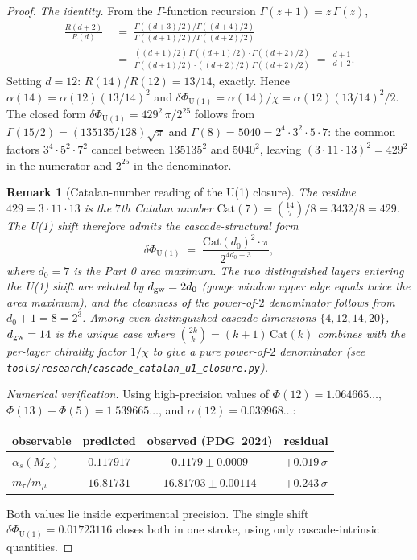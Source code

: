 \documentclass[12pt,a4paper]{article}
\newtheorem*{remark}{Remark}
\begin{document}
\begin{proof}
\emph{The identity.} From the $\Gamma$-function recursion $\Gamma(z+1)=z\,\Gamma(z)$,
\[
\begin{aligned}
\frac{R(d+2)}{R(d)}
&\;=\; \frac{\Gamma((d+3)/2)/\Gamma((d+4)/2)}{\Gamma((d+1)/2)/\Gamma((d+2)/2)} \\
&\;=\; \frac{((d+1)/2)\,\Gamma((d+1)/2)\cdot\Gamma((d+2)/2)}{\Gamma((d+1)/2)\cdot((d+2)/2)\,\Gamma((d+2)/2)}
\;=\; \frac{d+1}{d+2}.
\end{aligned}
\]
Setting $d=12$: $R(14)/R(12)=13/14$, exactly. Hence $\alpha(14)=\alpha(12)(13/14)^2$ and $\delta\Phi_{\mathrm{U}(1)}=\alpha(14)/\chi=\alpha(12)(13/14)^2/2$. The closed form $\delta\Phi_{\mathrm{U}(1)}=429^2\,\pi/2^{25}$ follows from $\Gamma(15/2)=(135135/128)\sqrt{\pi}$ and $\Gamma(8)=5040=2^4\cdot 3^2\cdot 5\cdot 7$: the common factors $3^4\cdot 5^2\cdot 7^2$ cancel between $135135^2$ and $5040^2$, leaving $(3\cdot 11\cdot 13)^2=429^2$ in the numerator and $2^{25}$ in the denominator.

\begin{remark}[Catalan-number reading of the U(1) closure]\label{rem:catalan-u1-closure}
The residue $429 = 3 \cdot 11 \cdot 13$ is the $7$th Catalan number $\mathrm{Cat}(7) = \binom{14}{7}/8 = 3432/8 = 429$. The U(1) shift therefore admits the cascade-structural form
\[
\delta\Phi_{\mathrm{U}(1)} \;=\; \frac{\mathrm{Cat}(d_0)^2 \cdot \pi}{2^{4 d_0 - 3}},
\]
where $d_0 = 7$ is the Part 0 area maximum. The two distinguished layers entering the U(1) shift are related by $d_{\rm gw} = 2 d_0$ (gauge window upper edge equals twice the area maximum), and the cleanness of the power-of-$2$ denominator follows from $d_0 + 1 = 8 = 2^3$. Among even distinguished cascade dimensions $\{4, 12, 14, 20\}$, $d_{\rm gw} = 14$ is the unique case where $\binom{2k}{k} = (k+1)\,\mathrm{Cat}(k)$ combines with the per-layer chirality factor $1/\chi$ to give a pure power-of-$2$ denominator (see \texttt{tools/research/cascade\_catalan\_u1\_closure.py}).
\end{remark}

\emph{Numerical verification.} Using high-precision values of $\Phi(12)=1.064665\ldots$, $\Phi(13)-\Phi(5)=1.539665\ldots$, and $\alpha(12)=0.039968\ldots$:
\begin{center}
\renewcommand{\arraystretch}{1.3}
\begin{tabular}{lccc}
\toprule
observable & predicted & observed (PDG~2024) & residual \\
\midrule
$\alpha_s(M_Z)$ & $0.117917$ & $0.1179\pm 0.0009$ & $+0.019\,\sigma$ \\
$m_\tau/m_\mu$  & $16.81731$ & $16.81703\pm 0.00114$ & $+0.243\,\sigma$ \\
\bottomrule
\end{tabular}
\end{center}
Both values lie inside experimental precision. The single shift $\delta\Phi_{\mathrm{U}(1)}=0.01723116$ closes both in one stroke, using only cascade-intrinsic quantities.
\end{proof}
\end{document}
